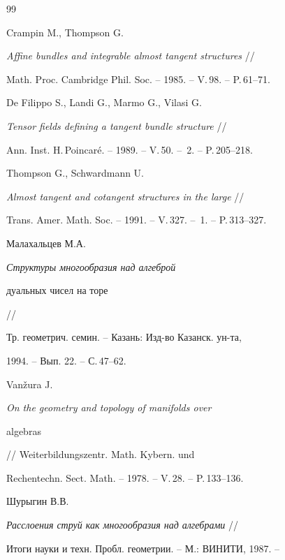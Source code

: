 \begin{thebibliography}{99}


Crampin M., Thompson G.


{\it Affine bundles and integrable almost tangent structures} //


Math. Proc. Cambridge Phil. Soc. -- 1985. -- V.\,98. -- P.\,61--71.







De Filippo S., Landi G., Marmo G., Vilasi G.


{\it Tensor fields defining a tangent bundle structure} //


Ann. Inst. H.\,Poincar\'e. -- 1989. -- V.\,50. -- \No\,2. -- P.\,205--218.










Thompson G., Schwardmann U.


{\it Almost tangent and cotangent structures in the large} //


Trans. Amer. Math. Soc. -- 1991. -- V.\,327. -- \No\,1. -- P.\,313--327.







Малахальцев М.А.


{\it Структуры многообразия над алгеброй


дуальных чисел на торе} //


Тр. геометрич. семин. -- Казань: Изд-во Казанск. ун-та,


1994. -- Вып. 22. -- С.\,47--62.







Van\v zura J.


{\it On the geometry and topology of manifolds over


algebras} // Weiterbildungszentr. Math. Kybern. und


Rechentechn. Sect. Math. -- 1978. -- V.\,28. -- P.\,133--136.







Шурыгин В.В.


{\it Расслоения струй как многообразия над алгебрами} //


Итоги науки и техн. Пробл. геометрии. -- М.: ВИНИТИ, 1987. --



\end{thebibliography}

